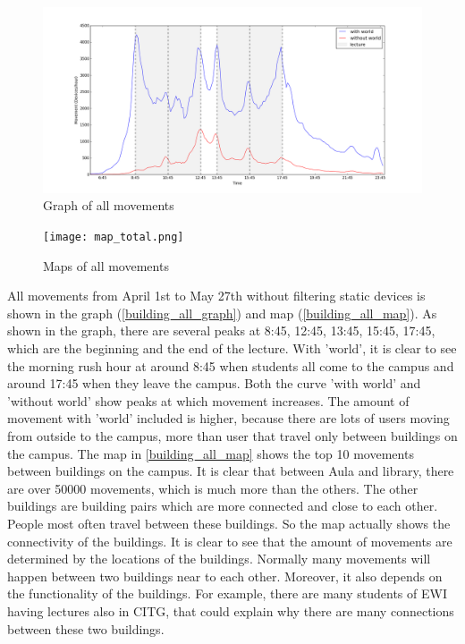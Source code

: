 \begin{figure}[H]
	\centering
	\includegraphics[scale=0.3]{building_all_graph.png}
	\captionsetup{justification=centering}
	\caption{Graph of all movements}
	\label{building_all_graph}
\end{figure}

\begin{figure}[H]
	\centering
	\texttt{[image: map\_total.png]}
	\captionsetup{justification=centering}
	\caption{Maps of all movements}
	\label{building_all_map}
\end{figure}
All movements from April 1st to May 27th without filtering static devices is shown in the graph (\autoref{building_all_graph}) and map (\autoref{building_all_map}). As shown in the graph, there are several peaks at 8:45, 12:45, 13:45, 15:45, 17:45, which are the beginning and the end of the lecture. With 'world', it is clear to see the morning rush hour at around 8:45 when students all come to the campus and around 17:45 when they leave the campus. Both the curve 'with world' and 'without world' show peaks at which movement increases. The amount of movement with 'world' included is higher, because there are lots of users moving from outside to the campus, more than user that travel only between buildings on the campus. The map in \autoref{building_all_map} shows the top 10 movements between buildings on the campus. It is clear that between Aula and library, there are over 50000 movements, which is much more than the others. The other buildings are building pairs which are more connected and close to each other. People most often travel between these buildings. So the map actually shows the connectivity of the buildings. It is clear to see that the amount of movements are determined by the locations of the buildings. Normally many movements will happen between two buildings near to each other. Moreover, it also depends on the functionality of the buildings. For example, there are many students of EWI having lectures also in CITG, that could explain why there are many connections between these two buildings.

